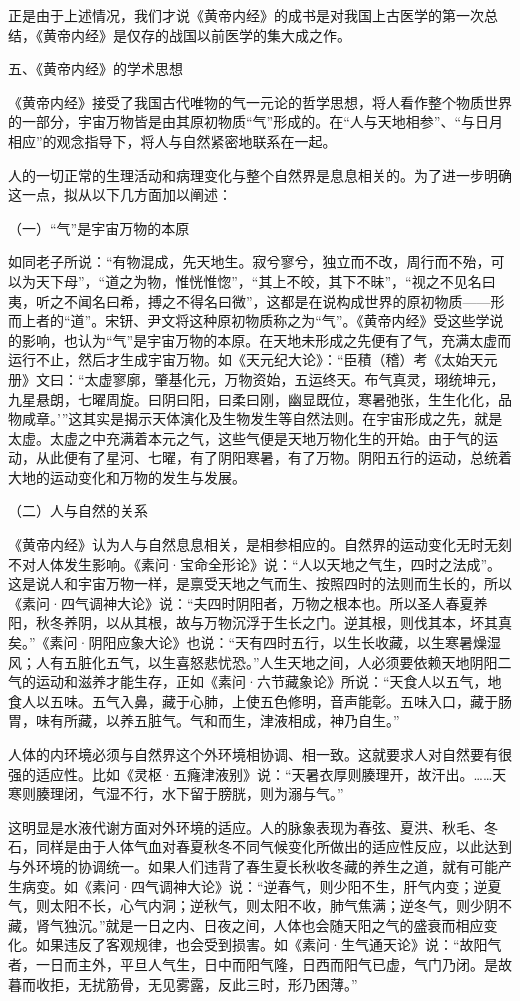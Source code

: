 \documentclass[12pt,UTF8]{ctexbook}
\begin{document}
正是由于上述情况，我们才说《黄帝内经》的成书是对我国上古医学的第一次总结，《黄帝内经》是仅存的战国以前医学的集大成之作。

五、《黄帝内经》的学术思想

《黄帝内经》接受了我国古代唯物的气一元论的哲学思想，将人看作整个物质世界的一部分，宇宙万物皆是由其原初物质“气”形成的。在“人与天地相参”、“与日月相应”的观念指导下，将人与自然紧密地联系在一起。

人的一切正常的生理活动和病理变化与整个自然界是息息相关的。为了进一步明确这一点，拟从以下几方面加以阐述：

（一）“气”是宇宙万物的本原

如同老子所说：“有物混成，先天地生。寂兮寥兮，独立而不改，周行而不殆，可以为天下母”，“道之为物，惟恍惟惚”，“其上不皎，其下不昧”，“视之不见名曰夷，听之不闻名曰希，搏之不得名曰微”，这都是在说构成世界的原初物质——形而上者的“道”。宋钘、尹文将这种原初物质称之为“气”。《黄帝内经》受这些学说的影响，也认为“气”是宇宙万物的本原。在天地未形成之先便有了气，充满太虚而运行不止，然后才生成宇宙万物。如《天元纪大论》：“臣積（稽）考《太始天元册》文曰：“太虚寥廓，肇基化元，万物资始，五运终天。布气真灵，珝统坤元，九星悬朗，七曜周旋。曰阴曰阳，曰柔曰刚，幽显既位，寒暑弛张，生生化化，品物咸章。’”这其实是揭示天体演化及生物发生等自然法则。在宇宙形成之先，就是太虚。太虚之中充满着本元之气，这些气便是天地万物化生的开始。由于气的运动，从此便有了星河、七曜，有了阴阳寒暑，有了万物。阴阳五行的运动，总统着大地的运动变化和万物的发生与发展。

（二）人与自然的关系

《黄帝内经》认为人与自然息息相关，是相参相应的。自然界的运动变化无时无刻不对人体发生影响。《素问·宝命全形论》说：“人以天地之气生，四时之法成”。这是说人和宇宙万物一样，是禀受天地之气而生、按照四时的法则而生长的，所以《素问·四气调神大论》说：“夫四时阴阳者，万物之根本也。所以圣人春夏养阳，秋冬养阴，以从其根，故与万物沉浮于生长之门。逆其根，则伐其本，坏其真矣。”《素问·阴阳应象大论》也说：“天有四时五行，以生长收藏，以生寒暑燥湿风；人有五脏化五气，以生喜怒悲忧恐。”人生天地之间，人必须要依赖天地阴阳二气的运动和滋养才能生存，正如《素问·六节藏象论》所说：“天食人以五气，地食人以五味。五气入鼻，藏于心肺，上使五色修明，音声能彰。五味入口，藏于肠胃，味有所藏，以养五脏气。气和而生，津液相成，神乃自生。”

人体的内环境必须与自然界这个外环境相协调、相一致。这就要求人对自然要有很强的适应性。比如《灵枢·五癃津液别》说：“天暑衣厚则腠理开，故汗出。……天寒则腠理闭，气湿不行，水下留于膀胱，则为溺与气。”

这明显是水液代谢方面对外环境的适应。人的脉象表现为春弦、夏洪、秋毛、冬石，同样是由于人体气血对春夏秋冬不同气候变化所做出的适应性反应，以此达到与外环境的协调统一。如果人们违背了春生夏长秋收冬藏的养生之道，就有可能产生病变。如《素问·四气调神大论》说：“逆春气，则少阳不生，肝气内变；逆夏气，则太阳不长，心气内洞；逆秋气，则太阳不收，肺气焦满；逆冬气，则少阴不藏，肾气独沉。”就是一日之内、日夜之间，人体也会随天阳之气的盛衰而相应变化。如果违反了客观规律，也会受到损害。如《素问·生气通天论》说：“故阳气者，一日而主外，平旦人气生，日中而阳气隆，日西而阳气已虚，气门乃闭。是故暮而收拒，无扰筋骨，无见雾露，反此三时，形乃困薄。”
\end{document}
